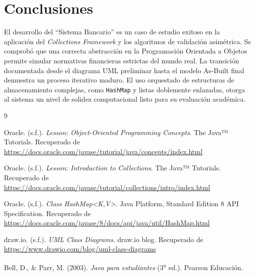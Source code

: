 \documentclass[12pt, letterpaper]{article}
\begin{document}
	\section{Conclusiones}
	El desarrollo del ``Sistema Bancario'' es un caso de estudio exitoso en la aplicación del \textit{Collections Framework} y los algoritmos de validación asimétrica. Se comprobó que una correcta abstracción en la Programación Orientada a Objetos permite simular normativas financieras estrictas del mundo real. La transición documentada desde el diagrama UML preliminar hasta el modelo As-Built final demuestra un proceso iterativo maduro. El uso orquestado de estructuras de almacenamiento complejas, como \texttt{HashMap} y listas doblemente enlazadas, otorga al sistema un nivel de solidez computacional listo para su evaluación académica.
	
	\newpage
	\renewcommand{\refname}{Bibliografía}
\begin{thebibliography}{9}
	
	Oracle. (s.f.). \textit{Lesson: Object-Oriented Programming Concepts}. The Java™ Tutorials. Recuperado de \url{https://docs.oracle.com/javase/tutorial/java/concepts/index.html}
	
	Oracle. (s.f.). \textit{Lesson: Introduction to Collections}. The Java™ Tutorials. Recuperado de \url{https://docs.oracle.com/javase/tutorial/collections/intro/index.html}
	
	Oracle. (s.f.). \textit{Class HashMap<K,V>}. Java Platform, Standard Edition 8 API Specification. Recuperado de \url{https://docs.oracle.com/javase/8/docs/api/java/util/HashMap.html}
	
	draw.io. (s.f.). \textit{UML Class Diagrams}. draw.io blog. Recuperado de \url{https://www.drawio.com/blog/uml-class-diagrams}
	
	Bell, D., \& Parr, M. (2003). \textit{Java para estudiantes} (3\textsuperscript{a} ed.). Pearson Educación.
	
\end{thebibliography}
	
\end{document}
